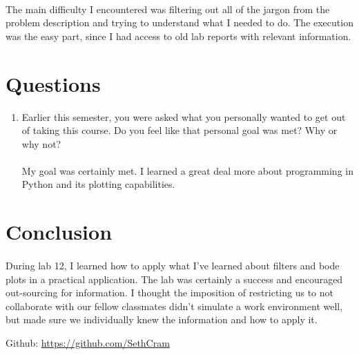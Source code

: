 \documentclass[12pt]{report}
\begin{document}
\paragraph{} The main difficulty I encountered was filtering out all of the jargon from the problem description and trying to understand what I needed to do. The execution was the easy part, since I had access to old lab reports with relevant information. 

\section{Questions} %
    \begin{enumerate}
        \item Earlier this semester, you were asked what you personally wanted to get out of taking this
course. Do you feel like that personal goal was met? Why or why not?
        \paragraph{} My goal was certainly met. I learned a great deal more about programming in Python and its plotting capabilities. 
    \end{enumerate}

\section{Conclusion}


    \paragraph{} During lab 12, I learned how to apply what I've learned about filters and bode plots in a practical application. The lab was certainly a success and encouraged out-sourcing for information. I thought the imposition of restricting us to not collaborate with our fellow classmates didn't simulate a work environment well, but made sure we individually knew the information and how to apply it.    
    
    Github: \url{https://github.com/SethCram} 
\end{document}
